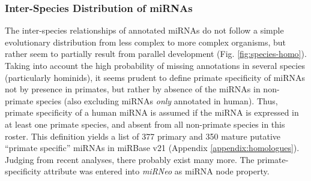 \subsubsection{Inter-Species Distribution of miRNAs}
The inter-species relationships of annotated miRNAs do not follow a simple evolutionary distribution from less complex to more complex organisms, but rather seem to partially result from parallel development (Fig. \ref{fig:species-homo}). Taking into account the high probability of missing annotations in several species (particularly hominids), it seems prudent to define primate specificity of miRNAs not by presence in primates, but rather by absence of the miRNAs in non-primate species (also excluding miRNAs \emph{only} annotated in human). Thus, primate specificity of a human miRNA is assumed if the miRNA is expressed in at least one primate species, and absent from all non-primate species in this roster. This definition yields a list of 377 primary and 350 mature putative “primate specific” miRNAs in miRBase v21 (Appendix \ref{appendix:homologues}). Judging from recent analyses,\cite{Londin2015} there probably exist many more. The primate-specificity attribute was entered into \emph{miRNeo} as miRNA node property.

